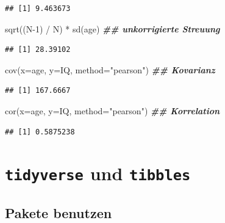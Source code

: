\documentclass[
]{book}
\newenvironment{Shaded}{\begin{snugshade}}{\end{snugshade}}
\newcommand{\AttributeTok}[1]{\textcolor[rgb]{0.77,0.63,0.00}{#1}}
\newcommand{\DecValTok}[1]{\textcolor[rgb]{0.00,0.00,0.81}{#1}}
\newcommand{\DocumentationTok}[1]{\textcolor[rgb]{0.56,0.35,0.01}{\textbf{\textit{#1}}}}
\newcommand{\FunctionTok}[1]{\textcolor[rgb]{0.00,0.00,0.00}{#1}}
\newcommand{\NormalTok}[1]{#1}
\newcommand{\SpecialCharTok}[1]{\textcolor[rgb]{0.00,0.00,0.00}{#1}}
\newcommand{\StringTok}[1]{\textcolor[rgb]{0.31,0.60,0.02}{#1}}
\begin{document}
\begin{verbatim}
## [1] 9.463673
\end{verbatim}

\begin{Shaded}
\begin{Highlighting}[]
\FunctionTok{sqrt}\NormalTok{((N}\DecValTok{{-}1}\NormalTok{) }\SpecialCharTok{/}\NormalTok{ N) }\SpecialCharTok{*} \FunctionTok{sd}\NormalTok{(age) }\DocumentationTok{\#\# unkorrigierte Streuung}
\end{Highlighting}
\end{Shaded}

\begin{verbatim}
## [1] 28.39102
\end{verbatim}

\begin{Shaded}
\begin{Highlighting}[]
\FunctionTok{cov}\NormalTok{(}\AttributeTok{x=}\NormalTok{age, }\AttributeTok{y=}\NormalTok{IQ, }\AttributeTok{method=}\StringTok{"pearson"}\NormalTok{)  }\DocumentationTok{\#\# Kovarianz}
\end{Highlighting}
\end{Shaded}

\begin{verbatim}
## [1] 167.6667
\end{verbatim}

\begin{Shaded}
\begin{Highlighting}[]
\FunctionTok{cor}\NormalTok{(}\AttributeTok{x=}\NormalTok{age, }\AttributeTok{y=}\NormalTok{IQ, }\AttributeTok{method=}\StringTok{"pearson"}\NormalTok{)  }\DocumentationTok{\#\# Korrelation}
\end{Highlighting}
\end{Shaded}

\begin{verbatim}
## [1] 0.5875238
\end{verbatim}

\hypertarget{tidyverse-und-tibbles}{%
\chapter{\texorpdfstring{\texttt{tidyverse} und \texttt{tibbles}}{tidyverse und tibbles}}\label{tidyverse-und-tibbles}}

\hypertarget{pakete-benutzen}{%
\section{Pakete benutzen}\label{pakete-benutzen}}
\end{document}
